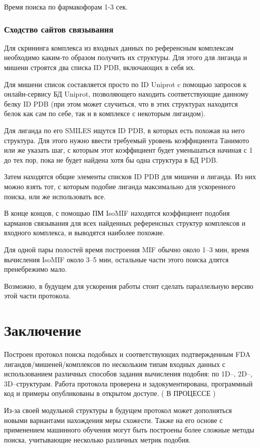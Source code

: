 \documentclass[a4paper,14pt]{article}         %
\begin{document}
Время поиска по фармакофорам 1-3 сек.
\subsubsection{Сходство сайтов связывания}
Для скрининга комплекса из входных данных по референсным комплексам необходимо каким-то образом получить их структуры. Для этого для лиганда и мишени строятся два списка ID PDB, включающих в себя их. 

Для мишени список составляется просто по ID Uniprot c помощью запросов к онлайн-сервису БД Uniprot, позволяющего находить соответствующие данному белку ID PDB (при этом может случиться, что в этих структурах находится белок как сам по себе, так и в комплексе с некоторым лигандом). 

Для лиганда по его SMILES ищутся ID PDB, в которых есть похожая на него структура. Для этого нужно ввести требуемый уровень коэффициента Танимото или же указать шаг, с которым этот коэффициент будет уменьшаться начиная с 1 до тех пор, пока не будет найдена хотя бы одна структура в БД PDB.

Затем находятся общие элементы списков ID PDB для мишени и лиганда. Из них можно взять тот, с которым подобие лиганда максимально для ускоренного поиска, или же использовать все.

В конце концов, с помощью ПМ IsoMIF находятся коэффициент подобия карманов связывания для всех найденных референсных структур комплексов и входного комплекса, и выводятся наиболее похожие.

Для одной пары полостей время построения MIF обычно около 1--3 мин, время вычисления IsoMIF около 3--5 мин, остальные части этого поиска длятся пренебрежимо мало.

Возможно, в будущем для ускорения работы стоит сделать параллельную версию этой части протокола.

\newpage
\section{Заключение}
Построен протокол поиска подобных и соответствующих подтвержденным FDA лигандов/мишеней/комплексов по нескольким типам входных данных с использованием различных способов задания вычисления подобия: по 1D--, 2D--, 3D--структурам. Работа протокола проверена и задокументирована, программный код и примеры опубликованы в открытом доступе. (\color{orange} В ПРОЦЕССЕ \color{black})

Из-за своей модульной структуры в будущем протокол может дополняться новыми вариантами нахождения меры схожести. Также на его основе с применением машинного обучения могут быть построены более сложные методы поиска, учитывающие несколько различных метрик подобия.


\newpage
\printbibliography[heading=bibintoc, title=Список использованных источников]
\end{document}
